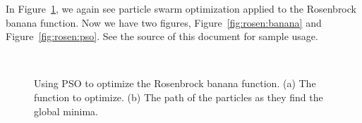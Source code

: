 \documentclass[master]{thesis}
\newcommand{\fref}[1]{Figure~\ref{#1}}   %
\begin{document}
In \fref{fig:pso.subfloat}, we again see particle swarm optimization applied to the Rosenbrock banana function.  Now we have two figures, \fref{fig:rosen:banana} and \fref{fig:rosen:pso}.  See the source of this document for sample usage.

\vspace{-1em} 
\begin{figure}[p!] %
     \\


    \caption[Using PSO to optimize the Rosenbrock banana function.]{Using PSO to optimize the Rosenbrock banana function.  (a)  The function to optimize.  (b)  The path of the particles as they find the global minima.}

    \label{fig:pso.subfloat}
\end{figure}
\end{document}
